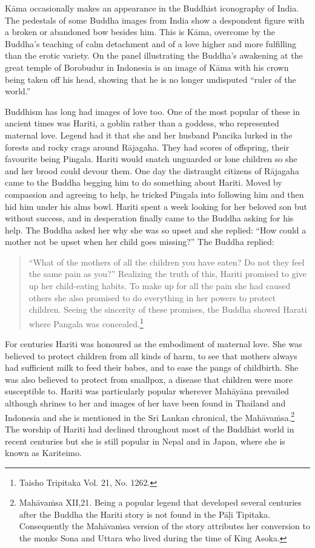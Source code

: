 \documentclass[10pt, openright]{book}
\begin{document}
Kāma occasionally makes an appearance in the Buddhist iconography of India. The pedestals of some Buddha images from India show a despondent figure with a broken or abandoned bow besides him. This is Kāma, overcome by the Buddha’s teaching of calm detachment and of a love higher and more fulfilling than the erotic variety. On the panel illustrating the Buddha’s awakening at the great temple of Borobudur in Indonesia is an image of Kāma with his crown being taken off his head, showing that he is no longer undisputed “ruler of the world.”


Buddhism has long had images of love too. One of the most popular of these in ancient times was Hariti, a goblin rather than a goddess, who represented maternal love. Legend had it that she and her husband Pancika lurked in the forests and rocky crags around Rājagaha. They had scores of offspring, their favourite being Pingala. Hariti would snatch unguarded or lone children so she and her brood could devour them. One day the distraught citizens of Rājagaha came to the Buddha begging him to do something about Hariti. Moved by compassion and agreeing to help, he tricked Pingala into following him and then hid him under his alms bowl. Hariti spent a week looking for her beloved son but without success, and in desperation finally came to the Buddha asking for his help. The Buddha asked her why she was so upset and she replied: “How could a mother not be upset when her child goes missing?” The Buddha replied:


\begin{quote}


“What of the mothers of all the children you have eaten? Do not they feel the same pain as you?” Realizing the truth of this, Hariti promised to give up her child-eating habits. To make up for all the pain she had caused others she also promised to do everything in her powers to protect children. Seeing the sincerity of these promises, the Buddha showed Harati where Pangala was concealed.\footnote {Taisho Tripitaka Vol. 21, No. 1262.}




\end{quote}
For centuries Hariti was honoured as the embodiment of maternal love. She was believed to protect children from all kinds of harm, to see that mothers always had sufficient milk to feed their babes, and to ease the pangs of childbirth. She was also believed to protect from smallpox, a disease that children were more susceptible to. Hariti was particularly popular wherever Mahāyāna prevailed although shrines to her and images of her have been found in Thailand and Indonesia and she is mentioned in the Sri Lankan chronical, the Mahāvaṁsa.\footnote {Mahāvaṁsa XII,21. Being a popular legend that developed several centuries after the Buddha the Hariti story is not found in the Pāḷi Tipitaka. Consequently the Mahāvaṁsa version of the story attributes her conversion to the monks Sona and Uttara who lived during the time of King Asoka.} The worship of Hariti had declined throughout most of the Buddhist world in recent centuries but she is still popular in Nepal and in Japan, where she is known as Kariteimo.
\end{document}
